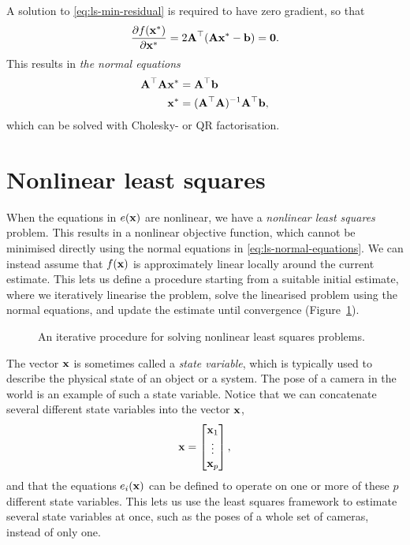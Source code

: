 A solution to \eqref{eq:ls-min-residual} is required to have zero gradient, so that
\begin{equation}
  \frac{\partial f({\boldsymbol{\mathbf{x}}}^\ast)}{\partial{\boldsymbol{\mathbf{x}}}^\ast} = 2 {\boldsymbol{\mathbf{A}}}^{\top} ({\boldsymbol{\mathbf{A}}} {\boldsymbol{\mathbf{x}}}^\ast - {\boldsymbol{\mathbf{b}}}) = \boldsymbol{\mathbf{0}}.
\end{equation}
This results in \emph{the normal equations}
\begin{align}
  {\boldsymbol{\mathbf{A}}}^{\top} {\boldsymbol{\mathbf{A}}} {\boldsymbol{\mathbf{x}}}^\ast &= {\boldsymbol{\mathbf{A}}}^{\top} {\boldsymbol{\mathbf{b}}} \label{eq:ls-normal-equations}\\
  {\boldsymbol{\mathbf{x}}}^\ast &= ({\boldsymbol{\mathbf{A}}}^{\top} {\boldsymbol{\mathbf{A}}})^{-1} {\boldsymbol{\mathbf{A}}}^{\top} {\boldsymbol{\mathbf{b}}},
\end{align}
which can be solved with Cholesky- or QR factorisation\footnotemark.

\section{Nonlinear least squares}
When the equations in $e({\boldsymbol{\mathbf{x}}})$ are nonlinear, we have a \emph{nonlinear least squares} problem.
This results in a nonlinear objective function, which cannot be minimised directly using the normal equations in \eqref{eq:ls-normal-equations}.
We can instead assume that $f({\boldsymbol{\mathbf{x}}})$ is approximately linear locally around the current estimate.
This lets us define a procedure starting from a suitable initial estimate, where we iteratively linearise the problem, solve the linearised problem using the normal equations, and update the estimate until convergence (Figure~\ref{fig:nls-procedure}).
\begin{figure}[htb]
    \centering
    
    \caption{An iterative procedure for solving nonlinear least squares problems.}
    \label{fig:nls-procedure}
\end{figure}

The vector ${\boldsymbol{\mathbf{x}}}$ is sometimes called a \emph{state variable}, which is typically used to describe the physical state of an object or a system.
The pose of a camera in the world is an example of such a state variable.
Notice that we can concatenate several different state variables into the vector ${\boldsymbol{\mathbf{x}}}$, 
\begin{equation}
  {\boldsymbol{\mathbf{x}}} = 
  \begin{bmatrix}
    {\boldsymbol{\mathbf{x}}}_1\\
    \vdots\\
    {\boldsymbol{\mathbf{x}}}_p
  \end{bmatrix},
\end{equation}
and that the equations $e_i({\boldsymbol{\mathbf{x}}})$ can be defined to operate on one or more of these $p$ different state variables.
This lets us use the least squares framework to estimate several state variables at once, such as the poses of a whole set of cameras, instead of only one.

